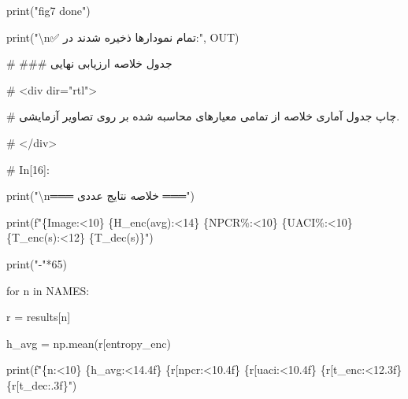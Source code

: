 print("fig7 done")

print("\textbackslash n✅ تمام نمودارها ذخیره شدند در:", OUT)

\# \#\#\# جدول خلاصه ارزیابی نهایی

\# \textless div dir="rtl"\textgreater{}

\# چاپ جدول آماری خلاصه از تمامی معیارهای محاسبه شده بر روی تصاویر آزمایشی.

\# \textless/div\textgreater{}

\# In{[}16{]}:

print("\textbackslash n═══ خلاصه نتایج عددی ═══")

print(f"\{\textquotesingle Image\textquotesingle:\textless10\} \{\textquotesingle H\_enc(avg)\textquotesingle:\textless14\} \{\textquotesingle NPCR\%\textquotesingle:\textless10\} \{\textquotesingle UACI\%\textquotesingle:\textless10\} \{\textquotesingle T\_enc(s)\textquotesingle:\textless12\} \{\textquotesingle T\_dec(s)\textquotesingle\}")

print("-"*65)

for n in NAMES:

r = results{[}n{]}

h\_avg = np.mean(r{[}\textquotesingle entropy\_enc\textquotesingle{]})

print(f"\{n:\textless10\} \{h\_avg:\textless14.4f\} \{r{[}\textquotesingle npcr\textquotesingle{]}:\textless10.4f\} \{r{[}\textquotesingle uaci\textquotesingle{]}:\textless10.4f\} \{r{[}\textquotesingle t\_enc\textquotesingle{]}:\textless12.3f\} \{r{[}\textquotesingle t\_dec\textquotesingle{]}:.3f\}")

